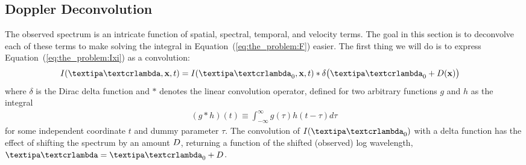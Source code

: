 \documentclass[modern]{aastex631}
\begin{document}
\subsection{Doppler Deconvolution}

The observed spectrum is an intricate function of spatial, spectral, temporal, and velocity terms. 
The goal in this section is to deconvolve each of these terms to make solving the integral in Equation~(\ref{eq:the_problem:F}) easier.
%
The first thing we will do is to express Equation~(\ref{eq:the_problem:Ixi})
as a convolution:
%
\begin{align}
    \label{eq:deconv:convolution}
    I(\lnlam, \x, t) & =
    I(\lnlam_0, \x, t)
    *
    \delta\big(\lnlam_0 + \D(\x)\big)
\end{align}
%
where $\delta$ is the Dirac delta function and $*$ denotes the linear convolution operator, defined for two arbitrary functions $g$ and $h$ as the integral
%
\begin{align}
    \label{eq:deconv:convolution_def}
    (g * h)(t) \equiv \int_{-\infty}^\infty g(\tau) h(t - \tau) d\tau
\end{align}
%
for some independent coordinate $t$ and dummy parameter $\tau$.
%
The convolution of $I(\lnlam_0)$ with a delta function has the effect of shifting the spectrum by an amount $D$, returning a function of the shifted (observed) log wavelength, $\lnlam = \lnlam_0 + \D$.
\end{document}
